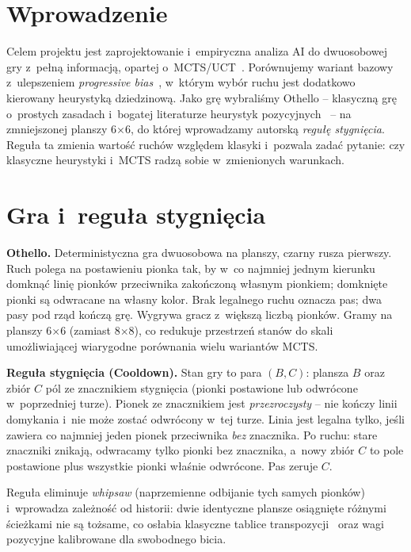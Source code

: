 \documentclass[12pt,a4paper]{article}
\begin{document}
\section{Wprowadzenie}
Celem projektu jest zaprojektowanie i~empiryczna analiza AI do dwuosobowej gry z~pełną informacją,
opartej o~MCTS/UCT~\cite{coulom2007efficient,browne2012survey,kocsis2006bandit}. Porównujemy wariant
bazowy z~ulepszeniem \emph{progressive bias}~\cite{chaslot2008progressive}, w~którym wybór ruchu
jest dodatkowo kierowany heurystyką dziedzinową. Jako grę wybraliśmy Othello -- klasyczną grę
o~prostych zasadach i~bogatej literaturze heurystyk pozycyjnych~\cite{buro1997evaluation} -- na
zmniejszonej planszy 6$\times$6, do której wprowadzamy autorską \emph{regułę stygnięcia}. Reguła ta
zmienia wartość ruchów względem klasyki i~pozwala zadać pytanie: czy klasyczne heurystyki i~MCTS
radzą sobie w~zmienionych warunkach.

\section{Gra i~reguła stygnięcia}\label{sec:gra}
\textbf{Othello.} Deterministyczna gra dwuosobowa na planszy, czarny rusza pierwszy. Ruch polega na
postawieniu pionka tak, by w~co najmniej jednym kierunku domknąć linię pionków przeciwnika
zakończoną własnym pionkiem; domknięte pionki są odwracane na własny kolor. Brak legalnego ruchu
oznacza pas; dwa pasy pod rząd kończą grę. Wygrywa gracz z~większą liczbą pionków. Gramy na planszy
6$\times$6 (zamiast 8$\times$8), co redukuje przestrzeń stanów do skali umożliwiającej wiarygodne
porównania wielu wariantów MCTS.

\textbf{Reguła stygnięcia (Cooldown).} Stan gry to para $(B, C)$: plansza $B$ oraz zbiór $C$ pól ze
znacznikiem stygnięcia (pionki postawione lub odwrócone w~poprzedniej turze). Pionek ze znacznikiem
jest \emph{przezroczysty} -- nie kończy linii domykania i~nie może zostać odwrócony w~tej turze.
Linia jest legalna tylko, jeśli zawiera co najmniej jeden pionek przeciwnika \emph{bez} znacznika.
Po ruchu: stare znaczniki znikają, odwracamy tylko pionki bez znacznika, a~nowy zbiór $C$ to pole
postawione plus wszystkie pionki właśnie odwrócone. Pas zeruje $C$.

Reguła eliminuje \emph{whipsaw} (naprzemienne odbijanie tych samych pionków) i~wprowadza zależność
od historii: dwie identyczne plansze osiągnięte różnymi ścieżkami nie są tożsame, co osłabia
klasyczne tablice transpozycji~\cite{childs2008transpositions} oraz wagi pozycyjne kalibrowane dla
swobodnego bicia.
\end{document}
